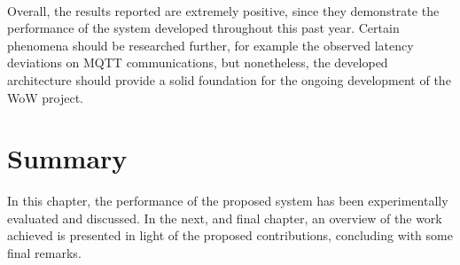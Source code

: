 \paragraph{} Overall, the results reported are extremely positive, since they demonstrate the performance of the system developed throughout this past year. Certain phenomena should be researched further, for example the observed latency deviations on \acs{MQTT} communications, but nonetheless, the developed architecture should provide a solid foundation for the ongoing development of the \acs{WoW} project.

\section{Summary}
In this chapter, the performance of the proposed system has been experimentally evaluated and discussed. 
In the next, and final chapter, an overview of the work achieved is presented in light of the proposed contributions, concluding with some final remarks.